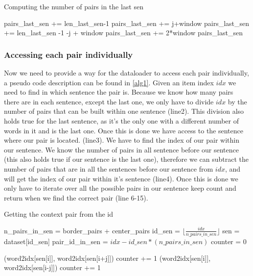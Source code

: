 \begin{algorithm}[h]
\caption{Computing the number of pairs in the last sen}
\label{alg2}
\begin{algorithmic}[1]
\STATE pairs\_last\_sen += len\_last\_sen-1
\ELSE
\STATE pairs\_last\_sen += j+window
\ENDIF
{}
\STATE pairs\_last\_sen += len\_last\_sen -1 -j + window
\ELSE
\STATE pairs\_last\_sen += 2*window
\ENDIF
\ENDFOR
\RETURN pairs\_last\_sen
\end{algorithmic}
\end{algorithm}

 \subsubsection{Accessing each pair individually}
Now we need to provide a way for the dataloader to access each pair individually, a pseudo code description can be found in \ref{alg1}. 
Given an item index $idx$ we need to find in which sentence the pair is. Because we know how many pairs there are in each sentence, except the last one, we only have to divide $idx$ by the number of pairs that can be built within one sentence (line2). This division also holds true for the last sentence, as it's the only one with a different number of words in it and is the last one.  Once this is done we have access to the sentence where our pair is located. (line3). We have to find the index of our pair within our sentence. We know the number of pairs in all sentence before our sentence (this also holds true if our sentence is the last one), therefore we can subtract the number of pairs that are in all the sentences before our sentence from $idx$, and will get the index of our pair within it's sentence (line4). Once this is done we only have to iterate over all the possible pairs in our sentence keep count and return when we find the correct pair (line 6-15).
\begin{algorithm}
\caption{Getting the context pair from the id}
\label{alg1}
\begin{algorithmic}[1]

\STATE n\_pairs\_in\_sen = border\_pairs + center\_pairs
 \STATE id\_sen = $\lfloor \frac{idx}{n\_pairs\_in\_sen} \rfloor$
\STATE  sen  = dataset[id\_sen]
\STATE  pair\_id\_in\_sen = $idx - id\_sen*(n\_pairs\_in\_sen)$
\STATE counter = 0

\RETURN (word2idx[sen[i]], word2idx[sen[i+j]])
\ENDIF
\STATE counter += 1
\ENDIF
{}
\RETURN (word2idx[sen[i]], word2idx[sen[i-j]])
\ENDIF
\STATE counter += 1
\ENDIF
\ENDFOR
\ENDFOR
\end{algorithmic}
\end{algorithm}

